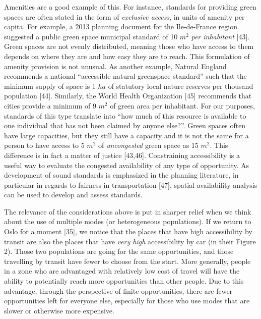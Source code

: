 \documentclass[10pt,letterpaper]{article}
\begin{document}
Amenities are a good example of this. For instance, standards for
providing green spaces are often stated in the form of \emph{exclusive
access}, in units of amenity per capita. For example, a 2013 planning
document for the Ile-de-France region suggested a public green space
municipal standard of 10 \(m^2\) \emph{per inhabitant} {[}43{]}. Green
spaces are not evenly distributed, meaning those who have access to them
depends on where they are and how easy they are to reach. This
formulation of amenity provision is not unusual. As another example,
Natural England recommends a national ``accessible natural greenspace
standard'' such that the minimum supply of space is 1 \(ha\) of
statutory local nature reserves per thousand population {[}44{]}.
Similarly, the World Health Organization {[}45{]} recommends that cities
provide a minimum of 9 \(m^2\) of green area per inhabitant. For our
purposes, standards of this type translate into ``how much of this
resource is available to one individual that has not been claimed by
anyone else?''. Green spaces often have large capacities, but they still
have a capacity and it is not the same for a person to have access to 5
\(m^2\) of \emph{uncongested} green space as 15 \(m^2\). This difference
is in fact a matter of justice {[}43,46{]}. Constraining accessibility
is a useful way to evaluate the congested availability of any type of
opportunity. As development of sound standards is emphasized in the
planning literature, in particular in regards to fairness in
transportation {[}47{]}, spatial availability analysis can be used to
develop and assess standards.

The relevance of the considerations above is put in sharper relief when
we think about the use of multiple modes (or heterogeneous populations).
If we return to Oslo for a moment {[}35{]}, we notice that the places
that have high accessibility by transit are also the places that have
\emph{very high} accessibility by car (in their Figure 2). Those two
populations are going for the same opportunities, and those travelling
by transit have fewer to choose from the start. More generally, people
in a zone who are advantaged with relatively low cost of travel will
have the ability to potentially reach more opportunities than other
people. Due to this advantage, through the perspective of finite
opportunities, there are fewer opportunities left for everyone else,
especially for those who use modes that are slower or otherwise more
expensive.
\end{document}
